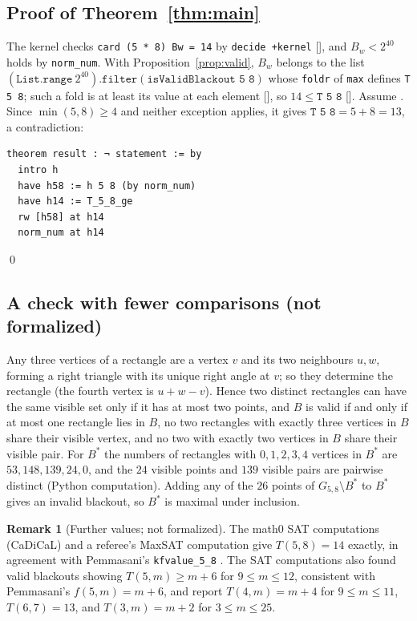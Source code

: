 \documentclass[11pt]{amsart}
\theoremstyle{plain}
\theoremstyle{definition}
\newtheorem{remark}[theorem]{Remark}
\newcommand{\Bs}{B^{*}}
\begin{document}
\subsection*{Proof of Theorem~\ref{thm:main}}
The kernel checks \texttt{card (5 * 8) Bw = 14} by \texttt{decide +kernel} [], and $B_w<2^{40}$ holds by \texttt{norm\_num}. With Proposition~\ref{prop:valid}, $B_w$ belongs to the list $(\texttt{List.range}\ 2^{40}).\texttt{filter}(\texttt{isValidBlackout 5 8})$ whose \texttt{foldr} of \texttt{max} defines \texttt{T 5 8}; such a fold is at least its value at each element [], so $14\le\texttt{T 5 8}$ [].
Assume . Since $\min(5,8)\ge4$ and neither exception applies, it gives $\texttt{T 5 8}=5+8=13$, a contradiction:
\begin{lstlisting}
theorem result : ¬ statement := by
  intro h
  have h58 := h 5 8 (by norm_num)
  have h14 := T_5_8_ge
  rw [h58] at h14
  norm_num at h14
\end{lstlisting}
\qed

\subsection*{A check with fewer comparisons (not formalized)}
Any three vertices of a rectangle are a vertex $v$ and its two neighbours $u,w$, forming a right triangle with its unique right angle at $v$; so they determine the rectangle (the fourth vertex is $u+w-v$). Hence two distinct rectangles can have the same visible set only if it has at most two points, and $B$ is valid if and only if at most one rectangle lies in $B$, no two rectangles with exactly three vertices in $B$ share their visible vertex, and no two with exactly two vertices in $B$ share their visible pair. For $\Bs$ the numbers of rectangles with $0,1,2,3,4$ vertices in $\Bs$ are $53,148,139,24,0$, and the $24$ visible points and $139$ visible pairs are pairwise distinct (Python computation). Adding any of the $26$ points of $G_{5,8}\setminus\Bs$ to $\Bs$ gives an invalid blackout, so $\Bs$ is maximal under inclusion.

\begin{remark}[Further values; not formalized]
The math0 SAT computations (CaDiCaL) and a referee's MaxSAT computation give $T(5,8)=14$ exactly, in agreement with Pemmasani's \texttt{kfvalue\_5\_8} \cite{Pem}. The SAT computations also found valid blackouts showing $T(5,m)\ge m+6$ for $9\le m\le12$, consistent with Pemmasani's $f(5,m)=m+6$, and report $T(4,m)=m+4$ for $9\le m\le11$, $T(6,7)=13$, and $T(3,m)=m+2$ for $3\le m\le25$.
\end{remark}
\end{document}
